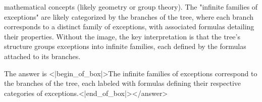 mathematical concepts (likely geometry or group theory). The "infinite families of exceptions" are likely categorized by the branches of the tree, where each branch corresponds to a distinct family of exceptions, with associated formulas detailing their properties. Without the image, the key interpretation is that the tree’s structure groups exceptions into infinite families, each defined by the formulas attached to its branches.  

The answer is <|begin_of_box|>The infinite families of exceptions correspond to the branches of the tree, each labeled with formulas defining their respective categories of exceptions.<|end_of_box|></answer>